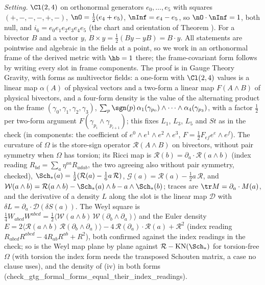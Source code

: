 \emph{Setting.} $\Cl(2,4)$ on orthonormal generators $e_{0}, \dots, e_{5}$ with squares $(+,-,-,-,+,-)$, $\nO = \tfrac12(e_{4} + e_{5})$, $\nInf = e_{4} - e_{5}$, so $\nO \cdot \nInf = 1$, both null, and $i_{6} = e_{0}e_{1}e_{2}e_{3}e_{4}e_{5}$ (the chart and orientation of Theorem ). For a bivector $B$ and a vector $y$, $B \times y = \tfrac12(By - yB) = B \cdot y$. All statements are pointwise and algebraic in the fields at a point, so we work in an orthonormal frame of the derived metric with $\hb = 1$ there; the frame-covariant form follows by writing every slot in frame components. The proof is in Gauge Theory Gravity, with forms as multivector fields: a one-form with $\Cl(2,4)$ values is a linear map $\alpha(A)$ of physical vectors and a two-form a linear map $F(A \wedge B)$ of physical bivectors, and a four-form density is the value of the alternating product on the frame $(\gamma_{0}, \gamma_{1}, \gamma_{2}, \gamma_{3})$, $\sum_{p}\sgn(p)\,\alpha_{1}(\gamma_{p_{0}}) \wedge \cdots \wedge \alpha_{4}(\gamma_{p_{3}})$, with a factor $\tfrac12$ per two-form argument $F(\gamma_{p_{i}} \wedge \gamma_{p_{i+1}})$; this fixes $L_{1}$, $L_{3}$, $L_{5}$ and $St$ as in the check (in components: the coefficient of $e^{0} \wedge e^{1} \wedge e^{2} \wedge e^{3}$, $F = \tfrac12 F_{ef}e^{e} \wedge e^{f}$). The curvature of $\Omega$ is the store-sign operator $\mathcal{R}(A \wedge B)$ on bivectors, without pair symmetry when $\Omega$ has torsion; its Ricci map is $\mathcal{R}(b) = \partial_{a} \cdot \mathcal{R}(a \wedge b)$ (index reading $R_{bd} = \sum_{a}\eta^{aa}R_{adab}$, the two agreeing also without pair symmetry, checked), $\Sch_{*}(a) = \tfrac12(\mathcal{R}(a) - \tfrac16 a\,\mathcal{R})$, $\mathcal{G}(a) = \mathcal{R}(a) - \tfrac12 a\,\mathcal{R}$, and $\mathcal{W}(a \wedge b) = \mathcal{R}(a \wedge b) - \Sch_{*}(a) \wedge b - a \wedge \Sch_{*}(b)$; traces are $\tr M = \partial_{a} \cdot M(a)$, and the derivative of a density $L$ along the slot is the linear map $\mathcal{D}$ with $\delta L = \partial_{a} \cdot \mathcal{D}(\delta S(a))$. The Weyl square is $\tfrac14 W_{abcd}W^{abcd} = \tfrac12\langle\mathcal{W}(a \wedge b)\,\mathcal{W}(\partial_{b} \wedge \partial_{a})\rangle$ and the Euler density $E = 2\langle\mathcal{R}(a \wedge b)\,\mathcal{R}(\partial_{b} \wedge \partial_{a})\rangle - 4\,\mathcal{R}(\partial_{a}) \cdot \mathcal{R}(a) + \mathcal{R}^{2}$ (index reading $R_{abcd}R^{abcd} - 4R_{ab}R^{ab} + R^{2}$), both confirmed against the index readings in the check; so is the Weyl map plane by plane against $\mathcal{R} - \mathrm{KN}(\Sch_{*})$ for torsion-free $\Omega$ (with torsion the index form needs the transposed Schouten matrix, a case no clause uses), and the density of (iv) in both forms (check\_gtg\_formal\_forms\_equal\_their\_index\_readings).

